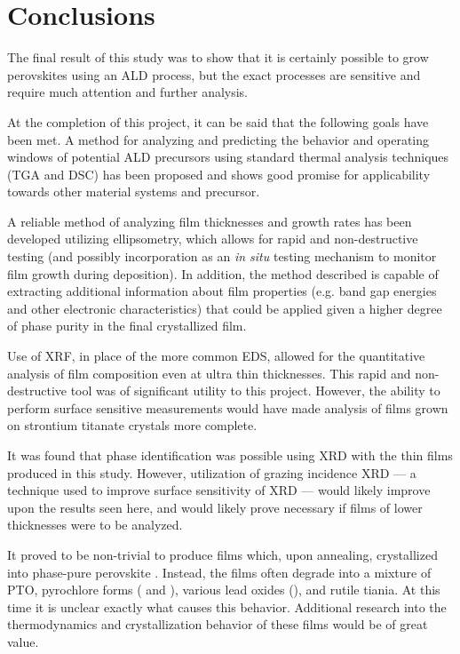 \chapter{Conclusions}
\label{ch:Conc}
\thispagestyle{empty}


The final result of this study was to show that it is certainly possible to grow perovskites using an ALD process, but the exact processes are sensitive and require much attention and further analysis.  

At the completion of this project, it can be said that the following goals have been met. A method for analyzing and predicting the behavior and operating windows of potential ALD precursors using standard thermal analysis techniques (TGA and DSC) has been proposed and shows good promise for applicability towards other material systems and precursor.\cite{Broido_TGA_1969,skoog_DSC_1998,wunderlich_thermal_1990}

A reliable method of analyzing film thicknesses and growth rates has been developed utilizing ellipsometry, which allows for rapid and non-destructive testing (and possibly incorporation as an \emph{in situ} testing mechanism to monitor film growth during deposition). In addition, the method described is capable of extracting additional information about film properties (e.g. band gap energies and other electronic characteristics) that could be applied given a higher degree of phase purity in the final crystallized film.\cite{Bruzzese_2010,schubert_infrared_2005,tompkins_spectroscopic_1999}

Use of XRF, in place of the more common EDS, allowed for the quantitative analysis of film composition even at ultra thin thicknesses. This rapid and non-destructive tool was of significant utility to this project. However, the ability to perform surface sensitive measurements would have made analysis of films grown on strontium titanate crystals more complete.\cite{Vincze_XRF_2005}

It was found that phase identification was possible using XRD with the thin films produced in this study. However, utilization of grazing incidence XRD --- a technique used to improve surface sensitivity of XRD --- would likely improve upon the results seen here, and would likely prove necessary if films of lower thicknesses were to be analyzed. \cite{giacovazzo_XRD_1992}

It proved to be non-trivial to produce films which, upon annealing, crystallized into phase-pure perovskite \PTO{}. Instead, the films often degrade into a mixture of PTO, pyrochlore forms ( and ), various lead oxides (), and rutile tiania. At this time it is unclear exactly what causes this behavior. Additional research into the thermodynamics and crystallization behavior of these films would be of great value. 

